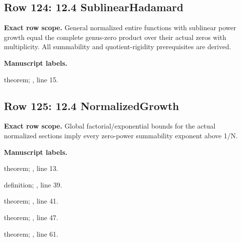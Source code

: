 \subsection{Row 124: 12.4 SublinearHadamard}
\label{row:124}
\textbf{Exact row scope.} General normalized entire functions with sublinear power growth equal the complete genus-zero product over their actual zeros with multiplicity. All summability and quotient-rigidity prerequisites are derived.\par\smallskip
\textbf{Manuscript labels.} \par\smallskip
{\small{}\par}
{\footnotesize\color{muted}theorem; , line 15.\par}\smallskip
{}
\subsection{Row 125: 12.4 NormalizedGrowth}
\label{row:125}
\textbf{Exact row scope.} Global factorial/exponential bounds for the actual normalized sections imply every zero-power summability exponent above 1/N.\par\smallskip
\textbf{Manuscript labels.} \par\smallskip
{\small{}\par}
{\footnotesize\color{muted}theorem; , line 13.\par}\smallskip
{\small{}\par}
{\footnotesize\color{muted}definition; , line 39.\par}\smallskip
{\small{}\par}
{\footnotesize\color{muted}theorem; , line 41.\par}\smallskip
{\small{}\par}
{\footnotesize\color{muted}theorem; , line 47.\par}\smallskip
{\small{}\par}
{\footnotesize\color{muted}theorem; , line 61.\par}\smallskip
{}
